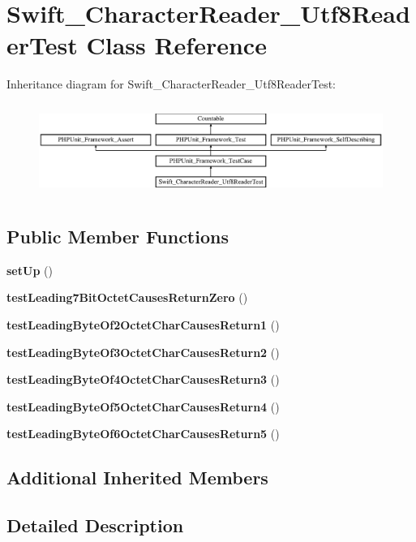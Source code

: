 \section{Swift\+\_\+\+Character\+Reader\+\_\+\+Utf8\+Reader\+Test Class Reference}
\label{class_swift___character_reader___utf8_reader_test}
Inheritance diagram for Swift\+\_\+\+Character\+Reader\+\_\+\+Utf8\+Reader\+Test\+:\begin{figure}[H]
\begin{center}
\leavevmode
\includegraphics[height=3.047619cm]{class_swift___character_reader___utf8_reader_test}
\end{center}
\end{figure}
\subsection*{Public Member Functions}
\begin{DoxyCompactItemize}
\item 
{\bf set\+Up} ()
\item 
{\bf test\+Leading7\+Bit\+Octet\+Causes\+Return\+Zero} ()
\item 
{\bf test\+Leading\+Byte\+Of2\+Octet\+Char\+Causes\+Return1} ()
\item 
{\bf test\+Leading\+Byte\+Of3\+Octet\+Char\+Causes\+Return2} ()
\item 
{\bf test\+Leading\+Byte\+Of4\+Octet\+Char\+Causes\+Return3} ()
\item 
{\bf test\+Leading\+Byte\+Of5\+Octet\+Char\+Causes\+Return4} ()
\item 
{\bf test\+Leading\+Byte\+Of6\+Octet\+Char\+Causes\+Return5} ()
\end{DoxyCompactItemize}
\subsection*{Additional Inherited Members}


\subsection{Detailed Description}


